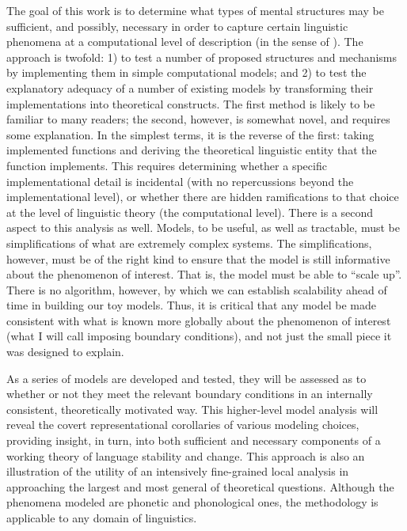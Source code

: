 The goal of this work is to determine what types of mental structures
may be sufficient, and possibly, necessary in order to capture certain
linguistic phenomena at a computational level of description (in the
sense of \citet{marr1982vision}). The approach is twofold: 1) to
test a number of proposed structures and mechanisms by implementing
them in simple computational models; and 2) to test the explanatory
adequacy of a number of existing models by transforming their implementations
into theoretical constructs. The first method is likely to be familiar
to many readers; the second, however, is somewhat novel, and requires
some explanation. In the simplest terms, it is the reverse of the
first: taking implemented functions and deriving the theoretical linguistic
entity that the function implements. This requires determining whether
a specific implementational detail is incidental (with no repercussions
beyond the implementational level), or whether there are hidden ramifications
to that choice at the level of linguistic theory (the computational
level). There is a second aspect to this analysis as well. Models,
to be useful, as well as tractable, must be simplifications of what
are extremely complex systems. The simplifications, however, must
be of the right kind to ensure that the model is still informative
about the phenomenon of interest. That is, the model must be able
to “scale up”. There is no algorithm, however, by which we can
establish scalability ahead of time in building our toy models. Thus,
it is critical that any model be made consistent with what is known
more globally about the phenomenon of interest (what I will call imposing
boundary conditions), and not just the small piece it was designed
to explain. 

As a series of models are developed and tested, they will be assessed
as to whether or not they meet the relevant boundary conditions in
an internally consistent, theoretically motivated way. This higher-level
model analysis will reveal the covert representational corollaries
of various modeling choices, providing insight, in turn, into both
sufficient and necessary components of a working theory of language
stability and change. This approach is also an illustration of the
utility of an intensively fine-grained local analysis in approaching
the largest and most general of theoretical questions. Although the
phenomena modeled are phonetic and phonological ones, the methodology
is applicable to any domain of linguistics. 

